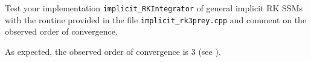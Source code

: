 \begin{problem}
  \begin{subproblem}[1] \label{subprb:RK3_1} Test your implementation \verb|implicit_RKIntegrator| of general
    implicit RK SSMs with the routine provided
    in the file \texttt{implicit\_rk3prey.cpp} and comment on the observed order
    of convergence.
    
    \cprotEnv \begin{solution} 
      As expected, the observed order of convergence is 3  (see ).
\end{solution}
\end{subproblem}

\end{problem}
